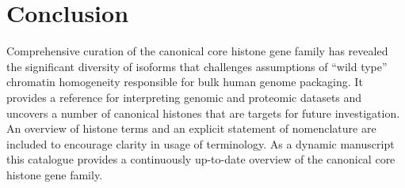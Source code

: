 \section{Conclusion}
\label{sec:conclusion}

  Comprehensive curation of the canonical core histone gene family
  has revealed the significant diversity of isoforms
  that challenges assumptions of ``wild type'' chromatin homogeneity
  responsible for bulk human genome packaging.
  It provides a reference for interpreting genomic and proteomic datasets
  and uncovers a number of canonical histones that are targets for future investigation.
  An overview of histone terms and an explicit statement of nomenclature
  are included to encourage clarity in usage of terminology.
  As a dynamic manuscript this catalogue provides a continuously up-to-date overview
  of the canonical core histone gene family.
